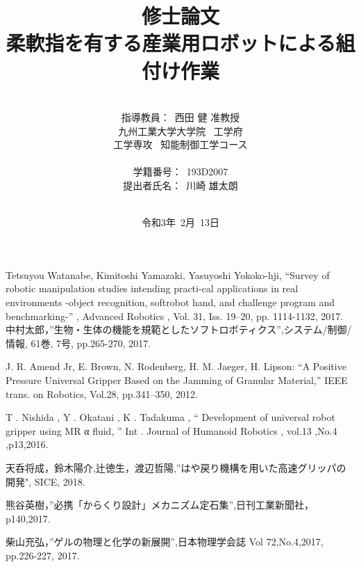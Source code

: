 \documentclass[a4paper,12pt]{jarticle}
\title{修士論文\\
柔軟指を有する産業用ロボットによる組付け作業\\
}
\author{\vspace{90mm}\\
指導教員：\ 西田 \hspace{0mm} 健 准教授\\
九州工業大学大学院\ \hspace{0mm} 工学府\\
工学専攻\ \hspace{0mm} 知能制御工学コース \\
\vspace{0mm}\\
学籍番号：\ 193D2007\\
提出者氏名：\ 川崎 \hspace{0mm} 雄太朗\\\vspace{5mm}\\ }
\date{令和3年\ 2月\ 13日}
\begin{document}
\titlepage
\maketitle
\thispagestyle{empty}
\newpage

\thispagestyle{empty}

\newpage
\tableofcontents


\newpage

\newpage
%
\newpage

\newpage
%
\newpage
%
\newpage
%
%



\begin{thebibliography}{99}

 Tetsuyou Watanabe, Kimitoshi Yamazaki, Yasuyoshi Yokoko-hji, “Survey of robotic manipulation studies intending practi-cal applications in real environments -object recognition, softrobot hand, and challenge program and benchmarking-” , Advanced Robotics , Vol. 31, Iss. 19–20, pp. 1114-1132, 2017.
 中村太郎，”生物・生体の機能を規範としたソフトロボティクス”,システム/制御/情報, 61巻, 7号, pp.265-270, 2017.

J. R. Amend Jr, E. Brown, N. Rodenberg, H. M. Jaeger, H. Lipson: “A Positive Pressure
Universal Gripper Based on the Jamming of Granular Material,” IEEE trans. on Robotics,
Vol.28, pp.341–350, 2012.

T . Nishida , Y . Okatani , K . Tadakuma ,
“ Development of universal robot gripper using
MR α fluid, ” Int . Journal of Humanoid Robotics , vol.13 ,No.4 ,p13,2016.

 天呑将成，鈴木陽介,辻徳生，渡辺哲陽,”はや戻り機構を用いた高速グリッパの開発", SICE, 2018.

 熊谷英樹，”必携「からくり設計」メカニズム定石集”,日刊工業新聞社，p140,2017.

 柴山充弘，”ゲルの物理と化学の新展開”,日本物理学会誌 Vol 72,No.4,2017, pp.226-227, 2017.  


\end{thebibliography}
\end{document}
